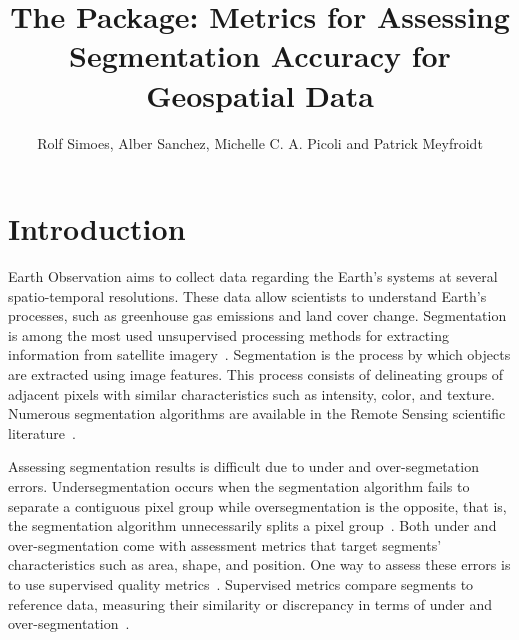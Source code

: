 
\title{The  Package: Metrics for Assessing Segmentation Accuracy for Geospatial Data}
\author{Rolf Simoes, Alber Sanchez, Michelle C. A. Picoli and Patrick Meyfroidt}

\maketitle


\section{Introduction}

Earth Observation aims to collect data regarding the Earth's systems at several spatio-temporal resolutions. 
These data allow scientists to understand Earth's processes, such as greenhouse gas emissions and land cover change. 
Segmentation is among the most used unsupervised processing methods for extracting information from satellite imagery~\citep{Hossain2019}. 
Segmentation is the process by which objects are extracted using image features.
This process consists of delineating groups of adjacent pixels with similar characteristics such as intensity, color, and texture. 
Numerous segmentation algorithms are available in the Remote Sensing scientific literature~\citep[see e.g.][]{Kotaridis2021}. 

Assessing segmentation results is difficult due to under and over-segmetation errors.
Undersegmentation occurs when the segmentation algorithm fails to separate a contiguous pixel group while oversegmentation is the opposite, that is, the segmentation algorithm unnecessarily splits a pixel group~\citep{Costa2018}. 
Both under and over-segmentation come with assessment metrics that target segments' characteristics such as area, shape, and position.
One way to assess these errors is to use supervised quality metrics~\citep{Costa2018}.
Supervised metrics compare segments to reference data, measuring their similarity or discrepancy in terms of under and over-segmentation~\citep{Clinton2010}. 

